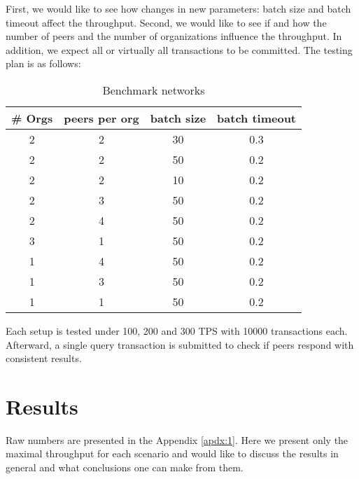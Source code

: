 First, we would like to see how changes in new parameters: batch size and batch timeout affect the throughput. Second, we would like to see if and how the number of peers and the number of organizations influence the throughput. In addition, we expect all or virtually all transactions to be committed. The testing plan is as follows:

\begin{table}[h!]
\begin{center}
\begin{tabular}{ c|c|c|c }
  \# Orgs & peers per org & batch size & batch timeout \\
 \hline
 \hline
 2 & 2 & 30 & 0.3 \\
 \hline
 2 & 2 & 50 & 0.2 \\
 \hline
 2 & 2 & 10 & 0.2 \\
 \hline
 2 & 3 & 50 & 0.2 \\
 \hline
 2 & 4 & 50 & 0.2 \\
 \hline
 3 & 1 & 50 & 0.2 \\
 \hline
 1 & 4 & 50 & 0.2 \\
 \hline
 1 & 3 & 50 & 0.2 \\
 \hline
 1 & 1 & 50 & 0.2 \\
 \hline
\end{tabular}
\end{center}
\caption{Benchmark networks}
\label{table:setups}
\end{table}

Each setup is tested under 100, 200 and 300 TPS with 10000 transactions each. Afterward, a single query transaction is submitted to check if peers respond with consistent results.

\section{Results}\label{sec:testres}

Raw numbers are presented in the Appendix \ref{apdx:1}. Here we present only the maximal throughput for each scenario and would like to discuss the results in general and what conclusions one can make from them.

